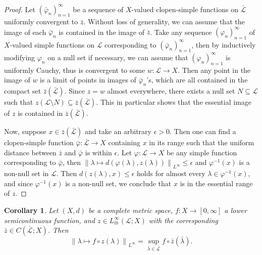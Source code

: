 \documentclass[reqno,centertags,12pt]{amsart}
\newtheorem{corollary}[theorem]{Corollary}
\theoremstyle{definition}
\numberwithin{equation}{section}
\newcommand{\norm}[1]{\left\|#1\right\|}
\newcommand{\seq}[1]{\left( #1 \right)}
\begin{document}
\begin{proof}
    Let $\seq{\bar{\varphi}_{n}}_{n=1}^{\infty}$ be a sequence of $X$-valued
    clopen-simple functions on $\bar{\mathcal{L}}$ uniformly convergent to $\bar{z}$.
    Without loss of generality, we can assume that the image of each
    $\bar{\varphi}_{n}$ is contained in the image of $\bar{z}$.
    Take any sequence $\seq{\varphi_{n}}_{n=1}^{\infty}$ of $X$-valued simple functions
    on $\mathcal{L}$ corresponding to $\seq{\bar{\varphi}_{n}}_{n=1}^{\infty}$,
    then by inductively modifying $\varphi_{n}$ on a null set if necessary,
    we can assume that $\seq{\varphi_{n}}_{n=1}^{\infty}$ is uniformly Cauchy,
    thus is convergent to some $w\colon\mathcal{L}\to X$.
    Then any point in the image of $w$ is a limit of points in images of
    $\bar{\varphi}_{n}$'s, which are all contained in the compact
    set $\bar{z}(\bar{\mathcal{L}})$. Since $z=w$ almost everywhere,
    there exists a null set $N\subseteq\mathcal{L}$ such that
    $z(\mathcal{L}\setminus N) \subseteq \bar{z}(\bar{\mathcal{L}})$.
    This in particular shows that the essential image of $z$
    is contained in $\bar{z}(\bar{\mathcal{L}})$.

    Now, suppose $x\in \bar{z}(\bar{\mathcal{L}})$ and take an arbitrary $\epsilon>0$.
    Then one can find a clopen-simple function $\bar{\varphi}\colon\bar{\mathcal{L}}\to X$
    containing $x$ in its range such that the uniform distance between $\bar{z}$ and
    $\bar{\varphi}$ is within $\epsilon$. Let $\varphi\colon\mathcal{L}\to X$
    be any simple function corresponding to $\bar{\varphi}$, then
    $\norm{\lambda\mapsto d(\varphi(\lambda),z(\lambda))}_{L^{\infty}} \leq \epsilon$
    and $\varphi^{-1}(x)$ is a non-null set in $\mathcal{L}$.
    Then $d(z(\lambda),x)\leq\epsilon$ holds for almost every
    $\lambda\in\varphi^{-1}(x)$, and since $\varphi^{-1}(x)$ is a non-null set,
    we conclude that $x$ is in the essential range of $z$.
\end{proof}

\begin{corollary}\label{CC.6}
    Let $(X,d)$ be a complete metric space, $f\colon X\to[0,\infty]$
    a lower semicontinuous function, and $z\in L_{tb}^{\infty}(\mathcal{L};X)$
    with the corresponding $\bar{z}\in C(\bar{\mathcal{L}};X)$. Then
    \[
        \norm{\lambda\mapsto f\circ z(\lambda)}_{L^{\infty}}
        = \sup_{\bar{\lambda}\in\bar{\mathcal{L}}}f\circ\bar{z}(\bar{\lambda}).
    \]
\end{corollary}
\end{document}
